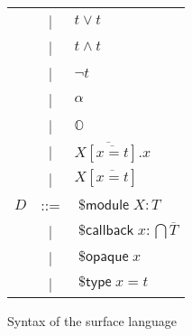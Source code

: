 \documentclass[a4paper,10pt]{article}
\DeclareMathOperator{\kwopq}{\textsf{\$opaque}}
\DeclareMathOperator{\kwtp}{\textsf{\$type}}
\DeclareMathOperator{\kwmdl}{\textsf{\$module}}
\DeclareMathOperator{\kwclbk}{\textsf{\$callback}}
\begin{document}
\begin{figure}
\begin{tabular}{r c l}
    & | & $t\vee t$ \\
    & | & $t\wedge t$ \\
    & | & $\neg t$\\
    & | & $\alpha$ \\
    & | & $\mathbb{O}$ \\
    & | & {\color{red}$\overline{X\left[\overline{x=t}\right].}x$} \\
    & | & {\color{red}$X\left[\overline{x=t}\right]$} \\
    $D$ & ::= & $\kwmdl X : T$ \\
    & | & $\kwclbk x : \bigcap \overline{T}$ \\
    & | & $\kwopq x$ \\
    & | & $\kwtp x = t$
  \end{tabular}
  \caption{Syntax of the surface language}
\end{figure}
\end{document}
